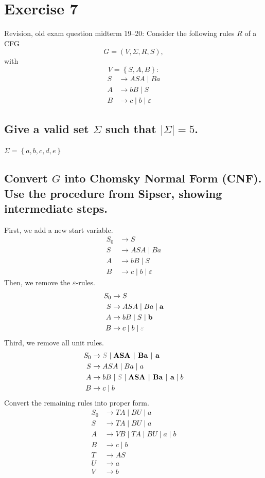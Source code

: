 \documentclass[a4paper,11pt]{article}
\newcommand{\Alphabet}{\Sigma}
\newcommand{\eps}{\varepsilon}
\newcommand{\set}[1]{\left\{ #1 \right\}}
\begin{document}
	\section{Exercise 7}
	Revision, old exam question midterm 19--20: Consider the following rules $R$ of a CFG
	\[
	G = (V,\Alphabet,R,S),
	\]
	with
	\[
	V = \set{S,A,B}:
	\]
	\begin{align*}
		S &\to ASA \mid Ba\\
		A &\to bB \mid S\\
		B &\to c \mid b \mid \eps
	\end{align*}

	\subsection{Give a valid set $\Alphabet$ such that $|\Alphabet| = 5$.}

	$\Alphabet=\set{a,b,c,d,e}$

	\subsection{Convert $G$ into Chomsky Normal Form (CNF). Use the procedure from Sipser, showing intermediate steps.}

	First, we add a new start variable.
	\begin{align*}
		S_0 &\to S\\
		S &\to ASA \mid Ba\\
		A &\to bB \mid S\\
		B &\to c \mid b \mid \eps
	\end{align*}
	Then, we remove the $\eps$-rules.
	\begin{align*}
		S_0 &\to S\\
		S &\to ASA \mid Ba \mid \textbf{a}\\
		A &\to bB \mid S \mid \textbf{b}\\
		B &\to c \mid b \mid \textcolor{gray}{\eps}
	\end{align*}
	Third, we remove all unit rules.
	\begin{align*}
		S_0 &\to \textcolor{gray}{S}\mid \textbf{ASA $\mid$ Ba $\mid$ a}\\
		S &\to ASA \mid Ba \mid a\\
		A &\to bB \mid \textcolor{gray}{S}\mid \textbf{ASA $\mid$ Ba $\mid$ a} \mid b\\
		B &\to c \mid b
	\end{align*}
	Convert the remaining rules into proper form.
	\begin{align*}
		S_0 &\to TA \mid BU \mid a\\
		S &\to TA \mid BU \mid a\\
		A &\to VB \mid TA \mid BU \mid a \mid b\\
		B &\to c \mid b\\
		T &\to AS\\
		U &\to a\\
		V &\to b
	\end{align*}
\end{document}
